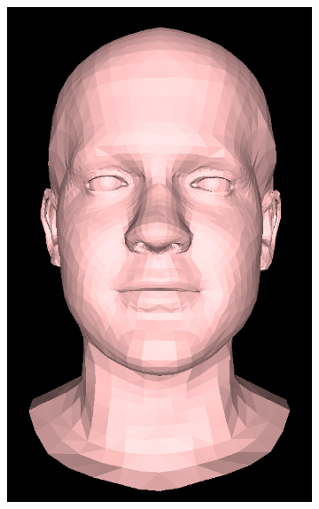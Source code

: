 \begin{figure}[h!]
\begin{subfigure}[b]{0.19\textwidth}
        \includegraphics[width=\textwidth]{figures/gen_sample/00015.png}
    \end{subfigure}
    \begin{subfigure}[b]{0.19\textwidth}

\end{subfigure}
\end{figure}
